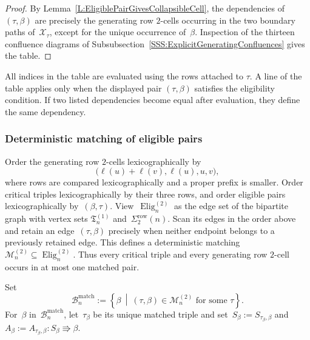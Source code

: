 \documentclass[a4paper, twoside, 11pt, english]{article}
\begin{document}
\begin{proof}
By Lemma~\ref{L:EligiblePairGivesCollapsibleCell}, the dependencies
of~$(\tau,\beta)$ are precisely the generating row $2$-cells occurring
in the two boundary paths of~$\mathcal X_\tau$, except for the unique
occurrence of~$\beta$. Inspection of the thirteen confluence diagrams of Subsubsection~\ref{SSS:ExplicitGeneratingConfluences} gives the table.
\end{proof}

All indices in the table are evaluated using the rows attached to
$\tau$. A line of the table applies only when the displayed pair
$(\tau,\beta)$ satisfies the eligibility condition. If two listed
dependencies become equal after evaluation, they define the same
dependency.


\subsubsection{Deterministic matching of eligible pairs}
Order the generating row $2$-cells
lexicographically by
\[
\bigl(\ell(u)+\ell(v),\ell(u),u,v\bigr),
\]
where rows are compared lexicographically and a proper prefix is smaller.
Order critical triples
lexicographically by their three rows, and order eligible pairs
lexicographically by~$(\beta,\tau)$.
View~$\operatorname{Elig}^{(2)}_n$ as the edge set of the bipartite
graph with vertex sets
$\mathfrak T_n^{(1)}$ and~$\Sigma^{\mathrm{row}}_2(n)$. Scan its
edges in the order above and retain an edge~$(\tau,\beta)$ precisely
when neither endpoint belongs to a previously retained edge. This
defines a deterministic matching~$\mathcal M_n^{(2)}
\subseteq
\operatorname{Elig}^{(2)}_n$.
Thus every critical triple and every generating row $2$-cell occurs
in at most one matched pair.

Set
\[
\mathcal B_n^{\mathrm{match}}
:=
\left\{
\beta
\ \middle|\
(\tau,\beta)\in\mathcal M_n^{(2)}
\text{ for some }\tau
\right\}.
\]
For~$\beta$ in~$\mathcal B_n^{\mathrm{match}}$, let~$\tau_\beta$ be its
unique matched triple and set~$
S_\beta
:=
S_{\tau_\beta,\beta}$ and~$
A_\beta
:=
A_{\tau_\beta,\beta}
\colon
S_\beta\Rrightarrow\beta$.
\end{document}

